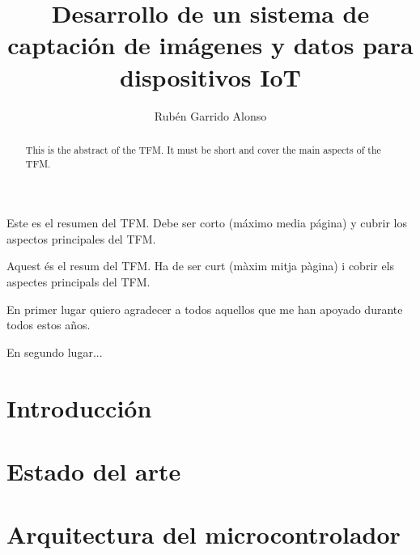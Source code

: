 \documentclass[twoside,spanish,a4paper,12pt]{tfg}
\title{Desarrollo de un sistema de captación de imágenes y datos para dispositivos IoT}
\author{Rubén Garrido Alonso}
\begin{document}
\portada
\cleardoublepage
\contraportada
\cleardoublepage
\declaracion
\cleardoublepage


\begin{resumen}
  Este es el resumen del TFM. Debe ser corto (máximo media página) y cubrir los aspectos principales del TFM.
\end{resumen}
\cleardoublepage

\begin{abstract}
  This is the abstract of the TFM. It must be short and cover the main aspects of the TFM.
\end{abstract}
\cleardoublepage

\begin{resum}
  Aquest és el resum del TFM. Ha de ser curt (màxim mitja pàgina) i cobrir els aspectes principals del TFM.
\end{resum}
\cleardoublepage


\begin{agradecimientos}
  En primer lugar quiero agradecer a todos aquellos que me han apoyado durante todos estos años.

  En segundo lugar...
\end{agradecimientos}
\cleardoublepage

\tableofcontents

\pagestyle{tfg}
\justify



\chapter{Introducción}


\chapter{Estado del arte}


\chapter{Arquitectura del microcontrolador}

\end{document}

